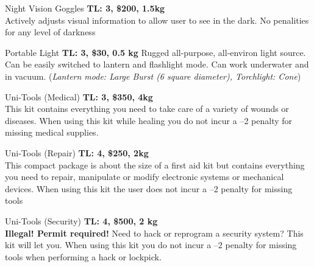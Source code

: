 \begin{genericsection}{Night Vision Goggles}
\textbf{TL: 3, \$200, 1.5kg}\\
Actively adjusts visual information to allow user to see in the dark. No penalities for any level of darkness
\end{genericsection}

\begin{genericsection}{Portable Light}
\textbf{TL: 3, \$30, 0.5 kg}
Rugged all-purpose, all-environ light source. Can be easily switched to lantern and flashlight mode. Can work underwater and in vacuum. (\textit{Lantern mode: Large Burst (6 square diameter), Torchlight: Cone})
\end{genericsection}

\begin{genericsection}{Uni-Tools (Medical)}
\textbf{TL: 3, \$350, 4kg}\\
This kit contains everything you need to take care of a variety of wounds or diseases. When using this kit while healing you do not incur a –2 penalty for missing medical supplies.
\end{genericsection}

\begin{genericsection}{Uni-Tools (Repair)}
\textbf{TL: 4, \$250, 2kg}\\
This compact package is about the size of a first aid kit but contains everything you need to repair, manipulate or modify electronic systems or mechanical devices. When using this kit the user does not incur a –2 penalty for missing tools
\end{genericsection}

\begin{genericsection}{Uni-Tools (Security)}
\textbf{TL: 4, \$500, 2 kg}\\
\textbf{Illegal! Permit required!} Need to hack or reprogram a security system? This kit will let you. When using this kit you do not incur a –2 penalty for missing tools when performing a hack or lockpick.
\end{genericsection}
